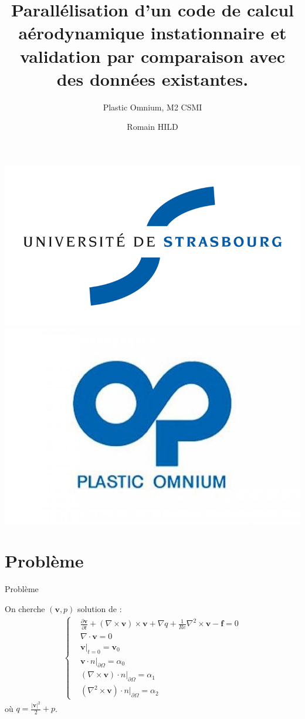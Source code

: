 \documentclass{beamer}
\title[Stage]{Parallélisation d'un code de calcul aérodynamique instationnaire et validation par comparaison avec des données existantes.}
\subtitle{Plastic Omnium, M2 CSMI}
\author{Romain HILD}
\institute{Université de Strasbourg}
\newcommand{\grad}{{\nabla}}
\newcommand{\rot}{{\nabla\times}}
\newcommand{\rott}{{\nabla^2\times}}
\newcommand{\diverg}{{\nabla\cdot}}
\newcommand{\restr}{{\big\rvert_{\partial\Omega}}}
\begin{document}
\begin{frame}
\includegraphics[scale=0.2]{uds.jpg}\includegraphics[scale=0.15]{po.jpg}
\titlepage
\end{frame}

\section{Problème}
\begin{frame}{Problème}
\begin{block}{On cherche $(\mathbf{v},p)$ solution de :}
\begin{eqnarray}
\label{depart}
\left\{
\begin{aligned}
&\frac{\partial \mathbf{v}}{\partial t} + (\rot  \mathbf{v})\times \mathbf{v} + \grad q + \frac{1}{Re}\rott  \mathbf{v}-\mathbf{f} = 0\\
&\diverg \mathbf{v} = 0\\
&\mathbf{v}\big\rvert_{t=0} = \mathbf{v}_0\\
&\mathbf{v}\cdot n\restr = \alpha_0\\
&(\rot  \mathbf{v})\cdot n\restr = \alpha_1\\
&(\rott  \mathbf{v})\cdot n\restr = \alpha_2
\end{aligned}
\right.
\end{eqnarray}
où $q = \frac{|\mathbf{v}|^2}{2}+p$.
\end{block}
\end{frame}
\end{document}
